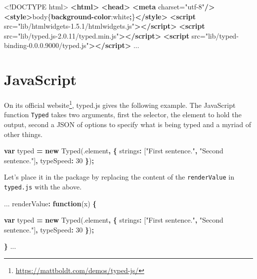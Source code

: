 \documentclass[
]{krantz}
\makeatletter
\newenvironment{Shaded}{\begin{snugshade}}{\end{snugshade}}
\newcommand{\AttributeTok}[1]{\textcolor[rgb]{0.61,0.61,0.61}{#1}}
\newcommand{\ConstantTok}[1]{\textcolor[rgb]{0,0,0}{#1}}
\newcommand{\DataTypeTok}[1]{\textcolor[rgb]{0.27,0.27,0.27}{#1}}
\newcommand{\DecValTok}[1]{\textcolor[rgb]{0.06,0.06,0.06}{#1}}
\newcommand{\KeywordTok}[1]{\textcolor[rgb]{0.27,0.27,0.27}{\textbf{#1}}}
\newcommand{\NormalTok}[1]{#1}
\newcommand{\OperatorTok}[1]{\textcolor[rgb]{0.43,0.43,0.43}{\textbf{#1}}}
\newcommand{\OtherTok}[1]{\textcolor[rgb]{0.37,0.37,0.37}{#1}}
\newcommand{\StringTok}[1]{\textcolor[rgb]{0.5,0.5,0.5}{#1}}
\renewcommand{\href}[2]{#2\footnote{\url{#1}}}
\newenvironment{kframe}{%
\medskip{}
\setlength{\fboxsep}{.8em}
 \def\at@end@of@kframe{}%
 \ifinner\ifhmode%
  \def\at@end@of@kframe{\end{minipage}}%
  \begin{minipage}{\columnwidth}%
 \fi\fi%
 \def\FrameCommand##1{\hskip\@totalleftmargin \hskip-\fboxsep
 \colorbox{shadecolor}{##1}\hskip-\fboxsep
     \hskip-\linewidth \hskip-\@totalleftmargin \hskip\columnwidth}%
 \MakeFramed {\advance\hsize-\width
   \@totalleftmargin\z@ \linewidth\hsize
   \@setminipage}}%
 {\par\unskip\endMakeFramed%
 \at@end@of@kframe}
\renewenvironment{Shaded}{\begin{kframe}}{\end{kframe}}
\makeatother
\begin{document}
\begin{Shaded}
\begin{Highlighting}[]
\DataTypeTok{<!DOCTYPE }\NormalTok{html}\DataTypeTok{>}
\KeywordTok{<html>}
\KeywordTok{<head>}
\KeywordTok{<meta}\OtherTok{ charset=}\StringTok{"utf{-}8"}\KeywordTok{/>}
\KeywordTok{<style>}\NormalTok{body\{}\KeywordTok{background{-}color}\NormalTok{:}\ConstantTok{white}\OperatorTok{;}\NormalTok{\}}\KeywordTok{</style>}
\KeywordTok{<script}\OtherTok{ src=}\StringTok{"lib/htmlwidgets{-}1.5.1/htmlwidgets.js"}\KeywordTok{></script>}
\KeywordTok{<script}\OtherTok{ src=}\StringTok{"lib/typed.js{-}2.0.11/typed.min.js"}\KeywordTok{></script>}
\KeywordTok{<script}\OtherTok{ src=}\StringTok{"lib/typed{-}binding{-}0.0.0.9000/typed.js"}\KeywordTok{></script>}
\NormalTok{...}
\end{Highlighting}
\end{Shaded}

\hypertarget{javascript}{%
\section{JavaScript}\label{javascript}}

On its \href{https://mattboldt.com/demos/typed-js/}{official website}, typed.js gives the following example. The JavaScript function \texttt{Typed} takes two arguments, first the selector, the element to hold the output, second a JSON of options to specify what is being typed and a myriad of other things.

\begin{Shaded}
\begin{Highlighting}[]
\KeywordTok{var}\NormalTok{ typed }\OperatorTok{=} \KeywordTok{new} \AttributeTok{Typed}\NormalTok{(}\StringTok{\textquotesingle{}.element\textquotesingle{}}\OperatorTok{,} \OperatorTok{\{}
  \DataTypeTok{strings}\OperatorTok{:}\NormalTok{ [}\StringTok{"First sentence."}\OperatorTok{,} \StringTok{"Second sentence."}\NormalTok{]}\OperatorTok{,}
  \DataTypeTok{typeSpeed}\OperatorTok{:} \DecValTok{30}
\OperatorTok{\}}\NormalTok{)}\OperatorTok{;}
\end{Highlighting}
\end{Shaded}

Let's place it in the package by replacing the content of the \texttt{renderValue} in \texttt{typed.js} with the above.

\begin{Shaded}
\begin{Highlighting}[]
\NormalTok{...}
\NormalTok{renderValue}\OperatorTok{:} \KeywordTok{function}\NormalTok{(x) }\OperatorTok{\{}

  \KeywordTok{var}\NormalTok{ typed }\OperatorTok{=} \KeywordTok{new} \AttributeTok{Typed}\NormalTok{(}\StringTok{\textquotesingle{}.element\textquotesingle{}}\OperatorTok{,} \OperatorTok{\{}
    \DataTypeTok{strings}\OperatorTok{:}\NormalTok{ [}\StringTok{"First sentence."}\OperatorTok{,} \StringTok{"Second sentence."}\NormalTok{]}\OperatorTok{,}
    \DataTypeTok{typeSpeed}\OperatorTok{:} \DecValTok{30}
  \OperatorTok{\}}\NormalTok{)}\OperatorTok{;}

\OperatorTok{\}}
\NormalTok{...}
\end{Highlighting}
\end{Shaded}
\end{document}
